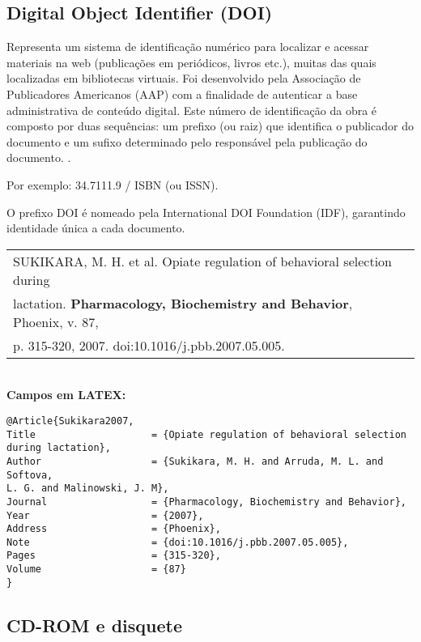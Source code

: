 \subsection{Digital Object Identifier (DOI)}
	
Representa um sistema de identificação numérico para localizar e
acessar materiais na web (publicações em periódicos, livros etc.), muitas
das quais localizadas em bibliotecas virtuais. Foi desenvolvido pela
Associação de Publicadores Americanos (AAP) com a finalidade de autenticar a base administrativa de conteúdo digital. Este número de
identificação da obra é composto por duas sequências: um prefixo (ou
raiz) que identifica o publicador do documento e um sufixo determinado
pelo responsável pela publicação do documento. \cite{Doic2016}.
	
Por exemplo: 34.7111.9 / ISBN (ou ISSN).
	
O prefixo DOI é nomeado pela International DOI Foundation (IDF),
garantindo identidade única a cada documento. \\
	
	
\begin{tabular}{|l|c|} \hline
	SUKIKARA, M. H. et al. Opiate regulation of behavioral selection during \\lactation. \textbf{Pharmacology, Biochemistry and Behavior}, Phoenix, v. 87,\\ p. 315-320, 2007. doi:10.1016/j.pbb.2007.05.005. 
	                                                                        \\\hline
\end{tabular} \\
	
\textbf{Campos em LATEX:} 
	
\begingroup
\fontsize{10pt}{12pt}\selectfont
\begin{verbatim}
@Article{Sukikara2007,
Title                    = {Opiate regulation of behavioral selection 
during lactation},
Author                   = {Sukikara, M. H. and Arruda, M. L. and 
Softova,
L. G. and Malinowski, J. M},
Journal                  = {Pharmacology, Biochemistry and Behavior},
Year                     = {2007},
Address                  = {Phoenix},
Note                     = {doi:10.1016/j.pbb.2007.05.005},
Pages                    = {315-320},
Volume                   = {87}
}

\end{verbatim}
\endgroup
	
\subsection{CD-ROM e disquete}
	

